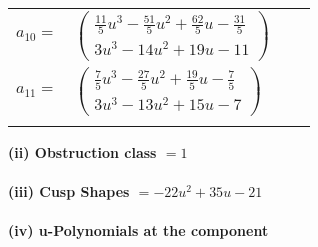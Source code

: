 \documentclass[1p]{elsarticle_modified}
\theoremstyle{definition}
\begin{document}
\begin{tabular}{m{7pt} m{180pt} m{7pt} m{180pt} }
\flushright $a_{10}=$&$\begin{pmatrix}\frac{11}{5} u^3-\frac{51}{5} u^2+\frac{62}{5} u-\frac{31}{5}\\3 u^3-14 u^2+19 u-11\end{pmatrix}$ \\
\flushright $a_{11}=$&$\begin{pmatrix}\frac{7}{5} u^3-\frac{27}{5} u^2+\frac{19}{5} u-\frac{7}{5}\\3 u^3-13 u^2+15 u-7\end{pmatrix}$\\&\end{tabular}
\flushleft \textbf{(ii) Obstruction class $= 1$}\\~\\
\flushleft \textbf{(iii) Cusp Shapes $= -22 u^2+35 u-21$}\\~\\
\newpage\renewcommand{\arraystretch}{1}
\flushleft \textbf{(iv) u-Polynomials at the component}\newline \\
\end{document}
